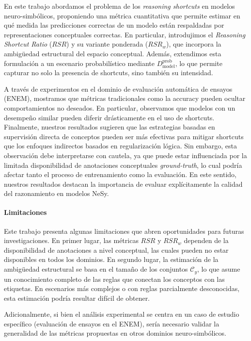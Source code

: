 \documentclass[12pt]{article}
\begin{document}
En este trabajo abordamos el problema de los \textit{reasoning shortcuts} en modelos neuro-simbólicos, proponiendo una métrica cuantitativa que permite estimar en qué medida las predicciones correctas de un modelo están respaldadas por representaciones conceptuales correctas. En particular, introdujimos el \textit{Reasoning Shortcut Ratio} ($RSR$) y su variante ponderada ($RSR_w$), que incorpora la ambigüedad estructural del espacio conceptual. Además, extendimos esta formulación a un escenario probabilístico mediante $D^{\text{prob}}_{\text{model}}$, lo que permite capturar no solo la presencia de shortcuts, sino también su intensidad.

A través de experimentos en el dominio de evaluación automática de ensayos (ENEM), mostramos que métricas tradicionales como la accuracy pueden ocultar comportamientos no deseados. En particular, observamos que modelos con un desempeño similar pueden diferir drásticamente en el uso de shortcuts. Finalmente, nuestros resultados sugieren que las estrategias basadas en supervisión directa de conceptos pueden ser más efectivas para mitigar shortcuts que los enfoques indirectos basados en regularización lógica. Sin embargo, esta observación debe interpretarse con cautela, ya que puede estar influenciada por la limitada disponibilidad de anotaciones conceptuales \textit{ground-truth}, lo cual podría afectar tanto el proceso de entrenamiento como la evaluación. En este sentido, nuestros resultados destacan la importancia de evaluar explícitamente la calidad del razonamiento en modelos NeSy.


\paragraph{Limitaciones}
Este trabajo presenta algunas limitaciones que abren oportunidades para futuras investigaciones. En primer lugar, las métricas $RSR$ y $RSR_w$ dependen de la disponibilidad de anotaciones a nivel conceptual, las cuales pueden no estar disponibles en todos los dominios. En segundo lugar, la estimación de la ambigüedad estructural se basa en el tamaño de los conjuntos $\mathcal{C}_{y}$, lo que asume un conocimiento completo de las reglas que conectan los conceptos con las etiquetas. En escenarios más complejos o con reglas parcialmente desconocidas, esta estimación podría resultar difícil de obtener.

Adicionalmente, si bien el análisis experimental se centra en un caso de estudio específico (evaluación de ensayos en el ENEM), sería necesario validar la generalidad de las métricas propuestas en otros dominios neuro-simbólicos.
\end{document}
